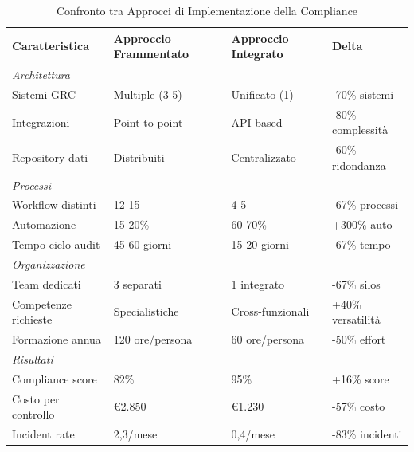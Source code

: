 \begin{table}[htbp]
\centering
\caption{Confronto tra Approcci di Implementazione della Compliance}
\label{tab:confronto_approcci}
\begin{tabular}{p{4cm} p{4cm} p{4cm} p{3cm}}
\toprule
\textbf{Caratteristica} & \textbf{Approccio Frammentato} & \textbf{Approccio Integrato} & \textbf{Delta} \\
\midrule
\textit{Architettura} & & & \\
Sistemi GRC & Multiple (3-5) & Unificato (1) & -70\% sistemi \\
Integrazioni & Point-to-point & API-based & -80\% complessità \\
Repository dati & Distribuiti & Centralizzato & -60\% ridondanza \\
\midrule
\textit{Processi} & & & \\
Workflow distinti & 12-15 & 4-5 & -67\% processi \\
Automazione & 15-20\% & 60-70\% & +300\% auto \\
Tempo ciclo audit & 45-60 giorni & 15-20 giorni & -67\% tempo \\
\midrule
\textit{Organizzazione} & & & \\
Team dedicati & 3 separati & 1 integrato & -67\% silos \\
Competenze richieste & Specialistiche & Cross-funzionali & +40\% versatilità \\
Formazione annua & 120 ore/persona & 60 ore/persona & -50\% effort \\
\midrule
\textit{Risultati} & & & \\
Compliance score & 82\% & 95\% & +16\% score \\
Costo per controllo & €2.850 & €1.230 & -57\% costo \\
Incident rate & 2,3/mese & 0,4/mese & -83\% incidenti \\
\bottomrule
\end{tabular}
\end{table}


